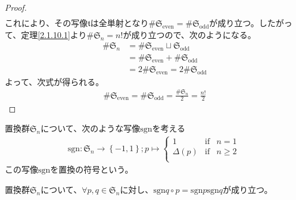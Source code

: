 \documentclass[dvipdfmx]{jsarticle}
\begin{document}
\begin{proof}
\begin{align*}
\end{align*}
これにより、その写像$\mathfrak{t}$は全単射となり${\#}\mathfrak{S}_{\mathrm{even}} = {\#}\mathfrak{S}_{\mathrm{odd}}$が成り立つ。したがって、定理\ref{2.1.10.1}より${\#}\mathfrak{S}_{n} = n!$が成り立つので、次のようになる。
\begin{align*}
{\#}\mathfrak{S}_{n} &= {\#}{\mathfrak{S}_{\mathrm{even}} \sqcup \mathfrak{S}_{\mathrm{odd}}}\\
&= {\#}\mathfrak{S}_{\mathrm{even}} + {\#}\mathfrak{S}_{\mathrm{odd}}\\
&= 2{\#}\mathfrak{S}_{\mathrm{even}} = 2{\#}\mathfrak{S}_{\mathrm{odd}}
\end{align*}
よって、次式が得られる。
\begin{align*}
{\#}\mathfrak{S}_{\mathrm{even}} = {\#}\mathfrak{S}_{\mathrm{odd}} = \frac{{\#}\mathfrak{S}_{n}}{2} = \frac{n!}{2}
\end{align*}
\end{proof}
\begin{dfn}
置換群$\mathfrak{S}_{n}$について、次のような写像$\mathrm{sgn} $を考える
\begin{align*}
\mathrm{sgn} :\mathfrak{S}_{n} \rightarrow \left\{ - 1,1 \right\};p \mapsto \left\{ \begin{matrix}
1 & \mathrm{if} & n = 1 \\
\varDelta(p) & \mathrm{if} & n \geq 2 \\
\end{matrix} \right.\ 
\end{align*}
この写像$\mathrm{sgn} $を置換の符号という。
\end{dfn}
\begin{thm}\label{2.1.10.7}
置換群$\mathfrak{S}_{n}$について、$\forall p,q \in \mathfrak{S}_{n}$に対し、${\mathrm{sgn} }{q \circ p} = {\mathrm{sgn} }p{\mathrm{sgn} }q$が成り立つ。
\end{thm}
\end{document}
